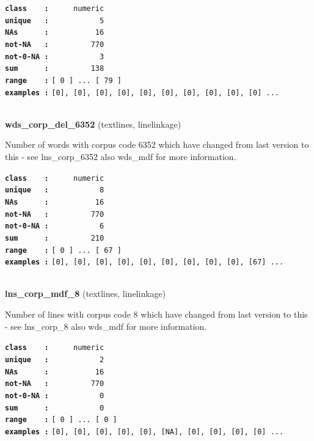 \documentclass[]{article}
\begin{document}
\textbf{\texttt{class\ \ \ \ :}} \texttt{~~~~~numeric}\\
\textbf{\texttt{unique\ \ \ :}} \texttt{~~~~~~~~~~~5}\\
\textbf{\texttt{NAs\ \ \ \ \ \ :}} \texttt{~~~~~~~~~~16}\\
\textbf{\texttt{not-NA\ \ \ :}} \texttt{~~~~~~~~~770}\\
\textbf{\texttt{not-0-NA\ :}} \texttt{~~~~~~~~~~~3}\\
\textbf{\texttt{sum\ \ \ \ \ \ :}} \texttt{~~~~~~~~~138}\\
\textbf{\texttt{range\ \ \ \ :}}
\texttt{{[}\ 0\ {]}\ ...\ {[}\ 79\ {]}}\\
\textbf{\texttt{examples\ :}}
\texttt{{[}0{]},\ {[}0{]},\ {[}0{]},\ {[}0{]},\ {[}0{]},\ {[}0{]},\ {[}0{]},\ {[}0{]},\ {[}0{]},\ {[}0{]}\ ...}\\

~

\textbf{wds\_corp\_del\_6352} (textlines, linelinkage)

Number of words with corpus code 6352 which have changed from last
version to this - see lns\_corp\_6352 also wds\_mdf for more
information.

\textbf{\texttt{class\ \ \ \ :}} \texttt{~~~~~numeric}\\
\textbf{\texttt{unique\ \ \ :}} \texttt{~~~~~~~~~~~8}\\
\textbf{\texttt{NAs\ \ \ \ \ \ :}} \texttt{~~~~~~~~~~16}\\
\textbf{\texttt{not-NA\ \ \ :}} \texttt{~~~~~~~~~770}\\
\textbf{\texttt{not-0-NA\ :}} \texttt{~~~~~~~~~~~6}\\
\textbf{\texttt{sum\ \ \ \ \ \ :}} \texttt{~~~~~~~~~210}\\
\textbf{\texttt{range\ \ \ \ :}}
\texttt{{[}\ 0\ {]}\ ...\ {[}\ 67\ {]}}\\
\textbf{\texttt{examples\ :}}
\texttt{{[}0{]},\ {[}0{]},\ {[}0{]},\ {[}0{]},\ {[}0{]},\ {[}0{]},\ {[}0{]},\ {[}0{]},\ {[}0{]},\ {[}67{]}\ ...}\\

~

\textbf{lns\_corp\_mdf\_8} (textlines, linelinkage)

Number of lines with corpus code 8 which have changed from last version
to this - see lns\_corp\_8 also wds\_mdf for more information.

\textbf{\texttt{class\ \ \ \ :}} \texttt{~~~~~numeric}\\
\textbf{\texttt{unique\ \ \ :}} \texttt{~~~~~~~~~~~2}\\
\textbf{\texttt{NAs\ \ \ \ \ \ :}} \texttt{~~~~~~~~~~16}\\
\textbf{\texttt{not-NA\ \ \ :}} \texttt{~~~~~~~~~770}\\
\textbf{\texttt{not-0-NA\ :}} \texttt{~~~~~~~~~~~0}\\
\textbf{\texttt{sum\ \ \ \ \ \ :}} \texttt{~~~~~~~~~~~0}\\
\textbf{\texttt{range\ \ \ \ :}}
\texttt{{[}\ 0\ {]}\ ...\ {[}\ 0\ {]}}\\
\textbf{\texttt{examples\ :}}
\texttt{{[}0{]},\ {[}0{]},\ {[}0{]},\ {[}0{]},\ {[}0{]},\ {[}NA{]},\ {[}0{]},\ {[}0{]},\ {[}0{]},\ {[}0{]}\ ...}\\
\end{document}
